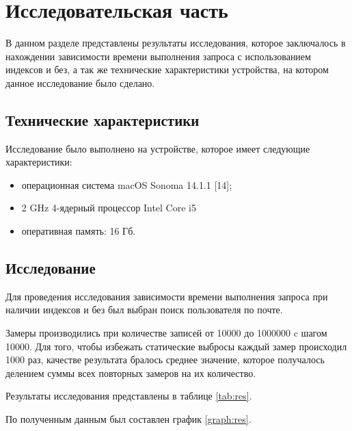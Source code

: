 \chapter*{Исследовательская часть}

В данном разделе представлены результаты исследования, которое заключалось в нахождении
зависимости времени выполнения запроса с использованием индексов и без, а так же технические 
характеристики устройства, на котором данное исследование было сделано.

\section{Технические характеристики}

Исследование было выполнено на устройстве, 
которое имеет следующие характеристики:

\begin{itemize}
    \item операционная система macOS Sonoma 14.1.1 [14];
    \item 2 GHz 4-ядерный процессор Intel Core i5
    \item оперативная память: 16 Гб.
\end{itemize}

\section{Исследование}

Для проведения исследования зависимости времени выполнения запроса при наличии индексов и без
был выбран поиск пользователя по почте.

Замеры производились при количестве записей от 10000 до 1000000 c шагом 10000. Для того, чтобы 
избежать статические выбросы каждый замер происходил 1000 раз, качестве результата
бралось среднее значение, которое получалось делением суммы всех повторных замеров на их количество.

Результаты исследования представлены в таблице \ref{tab:res}.

По полученным данным был составлен график \ref{graph:res}.


